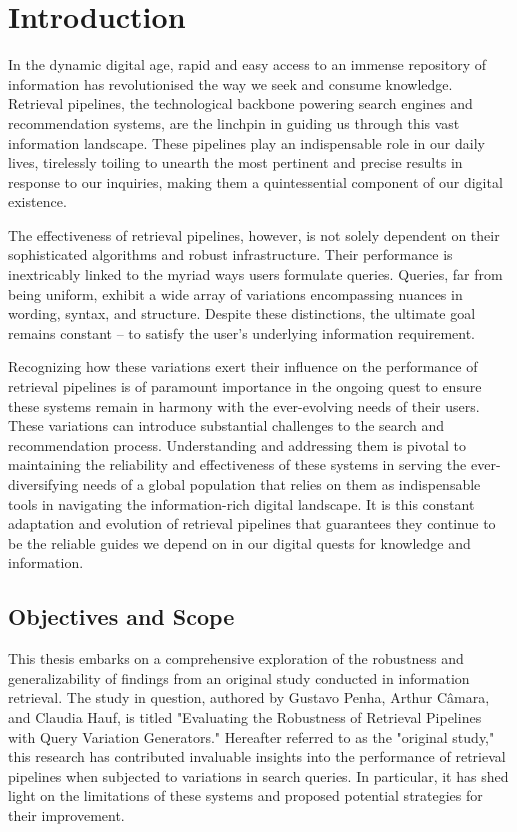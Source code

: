 \chapter{Introduction}
In the dynamic digital age, rapid and easy access to an immense repository of information has revolutionised the way we seek and consume knowledge. Retrieval pipelines, the technological backbone powering search engines and recommendation systems, are the linchpin in guiding us through this vast information landscape. These pipelines play an indispensable role in our daily lives, tirelessly toiling to unearth the most pertinent and precise results in response to our inquiries, making them a quintessential component of our digital existence.

The effectiveness of retrieval pipelines, however, is not solely dependent on their sophisticated algorithms and robust infrastructure. Their performance is inextricably linked to the myriad ways users formulate queries. Queries, far from being uniform, exhibit a wide array of variations encompassing nuances in wording, syntax, and structure. Despite these distinctions, the ultimate goal remains constant – to satisfy the user's underlying information requirement.

Recognizing how these variations exert their influence on the performance of retrieval pipelines is of paramount importance in the ongoing quest to ensure these systems remain in harmony with the ever-evolving needs of their users. These variations can introduce substantial challenges to the search and recommendation process. Understanding and addressing them is pivotal to maintaining the reliability and effectiveness of these systems in serving the ever-diversifying needs of a global population that relies on them as indispensable tools in navigating the information-rich digital landscape. It is this constant adaptation and evolution of retrieval pipelines that guarantees they continue to be the reliable guides we depend on in our digital quests for knowledge and information.

\section{Objectives and Scope}
This thesis embarks on a comprehensive exploration of the robustness and generalizability of findings from an original study conducted in information retrieval. The study in question, authored by Gustavo Penha, Arthur Câmara, and Claudia Hauf, is titled "Evaluating the Robustness of Retrieval Pipelines with Query Variation Generators." Hereafter referred to as the "original study," this research has contributed invaluable insights into the performance of retrieval pipelines when subjected to variations in search queries. In particular, it has shed light on the limitations of these systems and proposed potential strategies for their improvement.

